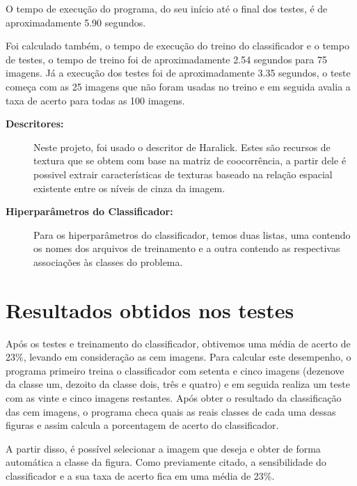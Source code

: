 O tempo de execução do programa, do seu início até o final dos testes, é de aproximadamente 5.90 segundos.

Foi calculado também, o tempo de execução do treino do classificador e o tempo de testes, o tempo de treino foi de aproximadamente 2.54 segundos para 75 imagens. Já a execução dos testes foi de aproximadamente 3.35 segundos, o teste começa com as 25 imagens que não foram usadas no treino e em seguida avalia a taxa de acerto para todas as 100 imagens.

\begin{description}
    \item[\textbf{Descritores:}]
    
        Neste projeto, foi usado o descritor de Haralick. Estes são recursos de textura que se obtem com base na matriz de coocorrência, a partir dele é possivel extrair características de texturas baseado na relação espacial existente entre os níveis de cinza da imagem.
    
    \item [\textbf{Hiperparâmetros do Classificador:}]
    
        Para os hiperparâmetros do classificador, temos duas listas, uma contendo os nomes dos arquivos de treinamento e a outra contendo as respectivas associações às classes do problema.
    
\end{description}

\newpage
\section{\esp Resultados obtidos nos testes}

Após os testes e treinamento do classificador, obtivemos uma média de acerto de 23\%, levando em consideração as cem imagens. Para calcular este desempenho, o programa primeiro treina o classificador com setenta e cinco imagens (dezenove da classe um, dezoito da classe dois, três e quatro) e em seguida realiza um teste com as vinte e cinco imagens restantes. Após obter o resultado da classificação das cem imagens, o programa checa quais as reais classes de cada uma dessas figuras e assim calcula a porcentagem de acerto do classificador.

A partir disso, é possível selecionar a imagem que deseja e obter de forma automática a classe da figura. Como previamente citado, a sensibilidade do classificador e a sua taxa de acerto fica em uma média de 23\%.



\newpage

\nocite {4309314}

\nocite {haralickTexture}

\nocite {mahotasClassification}

\nocite {gogul}

\nocite {scikitLearn}
